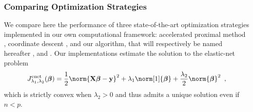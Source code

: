  
\subsubsection{Comparing Optimization Strategies} 

We compare here the performance of three state-of-the-art optimization
strategies implemented in our own computational framework:
accelerated proximal method \citep[see, e.g.,][]{2009_SIAM_Beck},
coordinate descent \citep[popularized by][]{2007_AAS_Friedman},
and our algorithm, that will respectively be named hereafter ,
 and .
Our implementations estimate the solution to the elastic-net problem
\begin{equation}
  \label{eq:enet}
    J_{\lambda_1,
    \lambda_2}^{\text{enet}}(\boldsymbol\beta)= \frac{1}{2}
  \norm{\mathbf{X}\boldsymbol\beta - \mathbf{y}}^2 +
  \lambda_1 \norm[1]{\boldsymbol\beta} + \frac{\lambda_2}{2} \norm{\boldsymbol\beta}^2
  \enspace,
\end{equation}
which is strictly convex when $\lambda_2>0$ and thus admits a unique
solution even if $n<p$.

